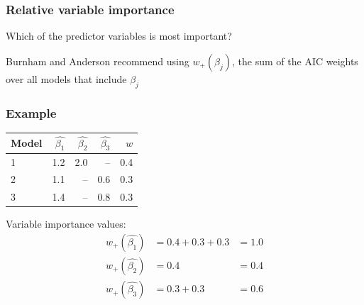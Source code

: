 \documentclass[color=usenames,dvipsnames]{beamer}\usepackage[]{graphicx}\usepackage[]{color}
\begin{document}
\begin{frame}
  \frametitle{Relative variable importance}
  {Which of the predictor variables is most important? \par}
  \vspace{0.5cm}
  \pause
  {Burnham and Anderson recommend using $w_+(\beta_j)$, the sum of
    the AIC weights over all models that include $\beta_j$}
\end{frame}



\begin{frame}
  \frametitle{Example}
  \begin{center}
    \begin{tabular}{lrrrr}
      \hline
      Model & $\hat{\beta_1}$ & $\hat{\beta_2}$ & $\hat{\beta_3}$ & $w$ \\
      \hline
      1 & 1.2 & 2.0 & --  & 0.4 \\
      2 & 1.1 & --  & 0.6 & 0.3 \\
      3 & 1.4 & --  & 0.8 & 0.3 \\
      \hline
    \end{tabular}
  \end{center}
  \pause
  Variable importance values:
  \begin{align*}
    w_+(\hat{\beta_1}) &= 0.4 + 0.3 + 0.3 &= 1.0 \\
    w_+(\hat{\beta_2}) &= 0.4             &= 0.4 \\
    w_+(\hat{\beta_3}) &= 0.3 + 0.3       &= 0.6
  \end{align*}
\end{frame}














\end{document}
